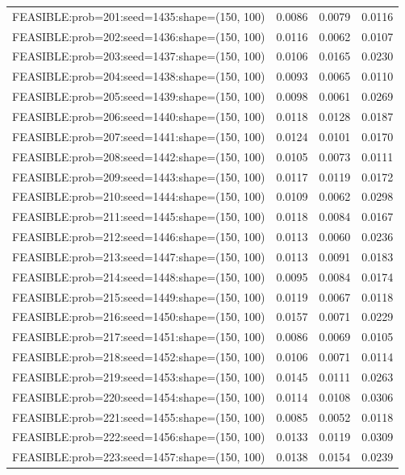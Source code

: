 \begin{longtable}{lccc}
FEASIBLE:prob=201:seed=1435:shape=(150, 100) &   0.0086 & 0.0079 & 0.0116 \\
FEASIBLE:prob=202:seed=1436:shape=(150, 100) &   0.0116 & 0.0062 & 0.0107 \\
FEASIBLE:prob=203:seed=1437:shape=(150, 100) &   0.0106 & 0.0165 & 0.0230 \\
FEASIBLE:prob=204:seed=1438:shape=(150, 100) &   0.0093 & 0.0065 & 0.0110 \\
FEASIBLE:prob=205:seed=1439:shape=(150, 100) &   0.0098 & 0.0061 & 0.0269 \\
FEASIBLE:prob=206:seed=1440:shape=(150, 100) &   0.0118 & 0.0128 & 0.0187 \\
FEASIBLE:prob=207:seed=1441:shape=(150, 100) &   0.0124 & 0.0101 & 0.0170 \\
FEASIBLE:prob=208:seed=1442:shape=(150, 100) &   0.0105 & 0.0073 & 0.0111 \\
FEASIBLE:prob=209:seed=1443:shape=(150, 100) &   0.0117 & 0.0119 & 0.0172 \\
FEASIBLE:prob=210:seed=1444:shape=(150, 100) &   0.0109 & 0.0062 & 0.0298 \\
FEASIBLE:prob=211:seed=1445:shape=(150, 100) &   0.0118 & 0.0084 & 0.0167 \\
FEASIBLE:prob=212:seed=1446:shape=(150, 100) &   0.0113 & 0.0060 & 0.0236 \\
FEASIBLE:prob=213:seed=1447:shape=(150, 100) &   0.0113 & 0.0091 & 0.0183 \\
FEASIBLE:prob=214:seed=1448:shape=(150, 100) &   0.0095 & 0.0084 & 0.0174 \\
FEASIBLE:prob=215:seed=1449:shape=(150, 100) &   0.0119 & 0.0067 & 0.0118 \\
FEASIBLE:prob=216:seed=1450:shape=(150, 100) &   0.0157 & 0.0071 & 0.0229 \\
FEASIBLE:prob=217:seed=1451:shape=(150, 100) &   0.0086 & 0.0069 & 0.0105 \\
FEASIBLE:prob=218:seed=1452:shape=(150, 100) &   0.0106 & 0.0071 & 0.0114 \\
FEASIBLE:prob=219:seed=1453:shape=(150, 100) &   0.0145 & 0.0111 & 0.0263 \\
FEASIBLE:prob=220:seed=1454:shape=(150, 100) &   0.0114 & 0.0108 & 0.0306 \\
FEASIBLE:prob=221:seed=1455:shape=(150, 100) &   0.0085 & 0.0052 & 0.0118 \\
FEASIBLE:prob=222:seed=1456:shape=(150, 100) &   0.0133 & 0.0119 & 0.0309 \\
FEASIBLE:prob=223:seed=1457:shape=(150, 100) &   0.0138 & 0.0154 & 0.0239 \\

\end{longtable}
